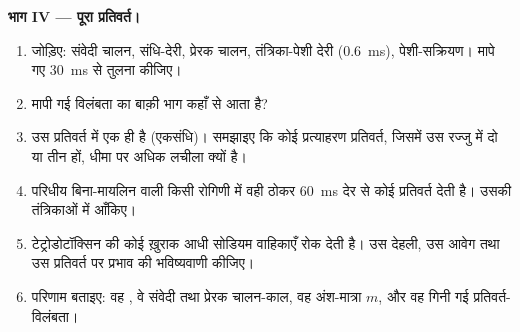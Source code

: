 \begin{problem}
\medskip
\noindent\textbf{भाग IV --- पूरा प्रतिवर्त।}
\begin{enumerate}[resume]
  \item जोड़िए: संवेदी चालन, संधि-देरी, प्रेरक चालन,
        तंत्रिका-पेशी देरी (\qty{0.6}{ms}), पेशी-सक्रियण। मापे गए
        \qty{30}{ms} से तुलना कीजिए।
  \item मापी गई विलंबता का बाक़ी भाग कहाँ से आता है?
  \item उस प्रतिवर्त में एक ही  है (एकसंधि)। समझाइए कि कोई
        प्रत्याहरण प्रतिवर्त, जिसमें उस रज्जु में दो या तीन  हों,
        धीमा पर अधिक लचीला क्यों है।
  \item परिधीय बिना-मायलिन वाली किसी रोगिणी में वही ठोकर
        \qty{60}{ms} देर से कोई प्रतिवर्त देती है। उसकी तंत्रिकाओं में  आँकिए।
  \item टेट्रोडोटॉक्सिन की कोई ख़ुराक आधी सोडियम वाहिकाएँ रोक देती है।
        उस देहली, उस आवेग तथा उस प्रतिवर्त पर प्रभाव की
        भविष्यवाणी कीजिए।
  \item परिणाम बताइए: वह , वे संवेदी तथा
        प्रेरक चालन-काल, वह अंश-मात्रा $m$, और वह
        गिनी गई प्रतिवर्त-विलंबता।
\end{enumerate}
\end{problem}

